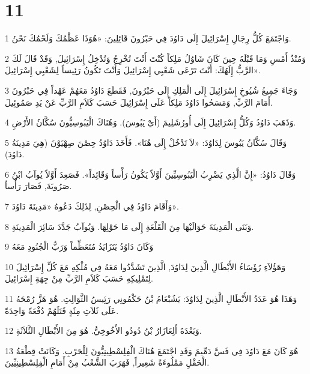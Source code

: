 \chapter{11}

\par 1 وَاجْتَمَعَ كُلُّ رِجَالِ إِسْرَائِيلَ إِلَى دَاوُدَ فِي حَبْرُونَ قَائِلِينَ: «هُوَذَا عَظْمُكَ وَلَحْمُكَ نَحْنُ.
\par 2 وَمُنْذُ أَمْسِ وَمَا قَبْلَهُ حِينَ كَانَ شَاوُلُ مَلِكاً كُنْتَ أَنْتَ تُخْرِجُ وَتُدْخِلُ إِسْرَائِيلَ, وَقَدْ قَالَ لَكَ الرَّبُّ إِلَهُكَ: أَنْتَ تَرْعَى شَعْبِي إِسْرَائِيلَ وَأَنْتَ تَكُونُ رَئِيساً لِشَعْبِي إِسْرَائِيلَ».
\par 3 وَجَاءَ جَمِيعُ شُيُوخِ إِسْرَائِيلَ إِلَى الْمَلِكِ إِلَى حَبْرُونَ, فَقَطَعَ دَاوُدُ مَعَهُمْ عَهْداً فِي حَبْرُونَ أَمَامَ الرَّبِّ, وَمَسَحُوا دَاوُدَ مَلِكاً عَلَى إِسْرَائِيلَ حَسَبَ كَلاَمِ الرَّبِّ عَنْ يَدِ صَمُوئِيلَ.
\par 4 وَذَهَبَ دَاوُدُ وَكُلُّ إِسْرَائِيلَ إِلَى أُورُشَلِيمَ (أَيْ يَبُوسَ). وَهُنَاكَ الْيَبُوسِيُّونَ سُكَّانُ الأَرْضِ.
\par 5 وَقَالَ سُكَّانُ يَبُوسَ لِدَاوُدَ: «لاَ تَدْخُلْ إِلَى هُنَا». فَأَخَذَ دَاوُدُ حِصْنَ صِهْيَوْنَ (هِيَ مَدِينَةُ دَاوُدَ).
\par 6 وَقَالَ دَاوُدُ: «إِنَّ الَّذِي يَضْرِبُ الْيَبُوسِيِّينَ أَوَّلاً يَكُونُ رَأْساً وَقَائِداً». فَصَعِدَ أَوَّلاً يُوآبُ ابْنُ صَرُويَةَ, فَصَارَ رَأْساً.
\par 7 وَأَقَامَ دَاوُدُ فِي الْحِصْنِ, لِذَلِكَ دَعُوهُ «مَدِينَةَ دَاوُدَ».
\par 8 وَبَنَى الْمَدِينَةَ حَوَالَيْهَا مِنَ الْقَلْعَةِ إِلَى مَا حَوْلِهَا. وَيُوآبُ جَدَّدَ سَائِرَ الْمَدِينَةِ.
\par 9 وَكَانَ دَاوُدُ يَتَزَايَدُ مُتَعَظِّماً وَرَبُّ الْجُنُودِ مَعَهُ
\par 10 وَهَؤُلاَءِ رُؤَسَاءُ الأَبْطَالِ الَّذِينَ لِدَاوُدَ, الَّذِينَ تَشَدَّدُوا مَعَهُ فِي مُلْكِهِ مَعَ كُلِّ إِسْرَائِيلَ لِتَمْلِيكِهِ حَسَبَ كَلاَمِ الرَّبِّ مِنْ جِهَةِ إِسْرَائِيلَ.
\par 11 وَهَذَا هُوَ عَدَدُ الأَبْطَالِ الَّذِينَ لِدَاوُدَ: يَشُبْعَامُ بْنُ حَكْمُونِي رَئِيسُ الثَّوَالِثِ. هُوَ هَزَّ رُمْحَهُ عَلَى ثَلاَثِ مِئَةٍ قَتَلَهُمْ دُفْعَةً وَاحِدَةً.
\par 12 وَبَعْدَهُ أَلِعَازَارُ بْنُ دُودُو الأَخُوخِيُّ. هُوَ مِنَ الأَبْطَالِ الثَّلاَثَةِ.
\par 13 هُوَ كَانَ مَعَ دَاوُدَ فِي فَسَّ دَمِّيمَ وَقَدِ اجْتَمَعَ هُنَاكَ الْفِلِسْطِينِيُّونَ لِلْحَرْبِ. وَكَانَتْ قِطْعَةُ الْحَقْلِ مَمْلُوءَةً شَعِيراً, فَهَرَبَ الشَّعْبُ مِنْ أَمَامِ الْفِلِسْطِينِيِّينَ.
